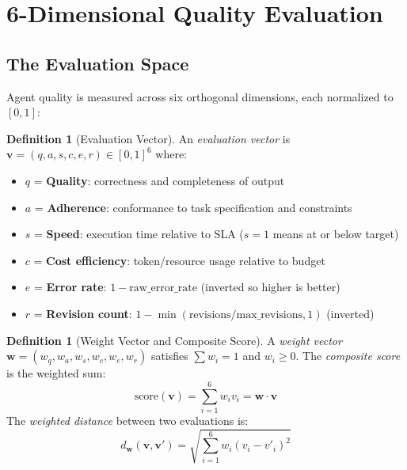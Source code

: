 \documentclass[12pt,a4paper]{article}
\theoremstyle{definition}
\newtheorem{definition}[theorem]{Definition}
\theoremstyle{remark}
\begin{document}
\section{6-Dimensional Quality Evaluation}\label{sec:evaluation}

\subsection{The Evaluation Space}

Agent quality is measured across six orthogonal dimensions, each normalized to $[0, 1]$:

\begin{definition}[Evaluation Vector]\label{def:eval-vector}
An \emph{evaluation vector} is $\mathbf{v} = (q, a, s, c, e, r) \in [0,1]^6$ where:
\begin{itemize}[leftmargin=2em]
  \item $q$ = \textbf{Quality}: correctness and completeness of output
  \item $a$ = \textbf{Adherence}: conformance to task specification and constraints
  \item $s$ = \textbf{Speed}: execution time relative to SLA ($s = 1$ means at or below target)
  \item $c$ = \textbf{Cost efficiency}: token/resource usage relative to budget
  \item $e$ = \textbf{Error rate}: $1 - \text{raw\_error\_rate}$ (inverted so higher is better)
  \item $r$ = \textbf{Revision count}: $1 - \min(\text{revisions}/\text{max\_revisions}, 1)$ (inverted)
\end{itemize}
\end{definition}

\begin{definition}[Weight Vector and Composite Score]\label{def:composite-score}
A \emph{weight vector} $\mathbf{w} = (w_q, w_a, w_s, w_c, w_e, w_r)$ satisfies $\sum w_i = 1$ and $w_i \geq 0$. The \emph{composite score} is the weighted sum:
\begin{equation}\label{eq:composite-score}
  \text{score}(\mathbf{v}) = \sum_{i=1}^{6} w_i v_i = \mathbf{w} \cdot \mathbf{v}
\end{equation}
The \emph{weighted distance} between two evaluations is:
\begin{equation}\label{eq:weighted-distance}
  d_{\mathbf{w}}(\mathbf{v}, \mathbf{v}') = \sqrt{\sum_{i=1}^{6} w_i (v_i - v'_i)^2}
\end{equation}
\end{definition}
\end{document}
